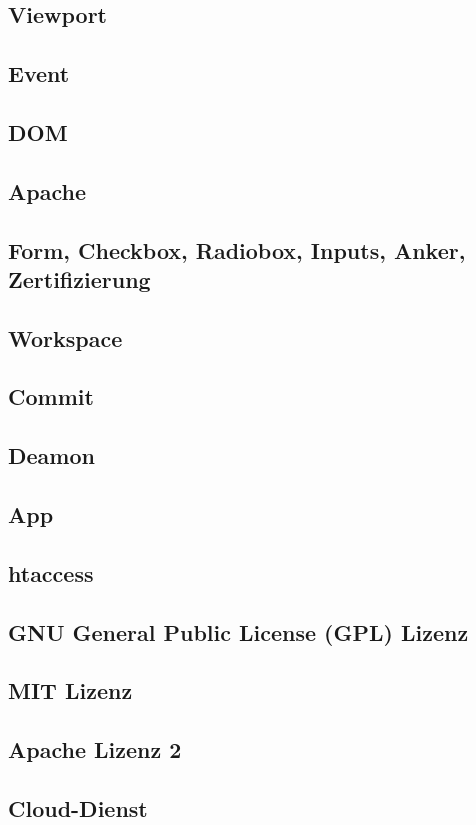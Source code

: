 		\subsection{Viewport}
		\subsection{Event}
		\subsection{DOM}
		\subsection{Apache}
		\subsection{Form, Checkbox, Radiobox, Inputs, Anker, Zertifizierung}
		\subsection{Workspace}
		\subsection{Commit}
		\subsection{Deamon}
		\subsection{App}
		\subsection{htaccess}
		\subsection{GNU General Public License (GPL) Lizenz}
		\subsection{MIT Lizenz}
		\subsection{Apache Lizenz 2}
		\subsection{Cloud-Dienst}
